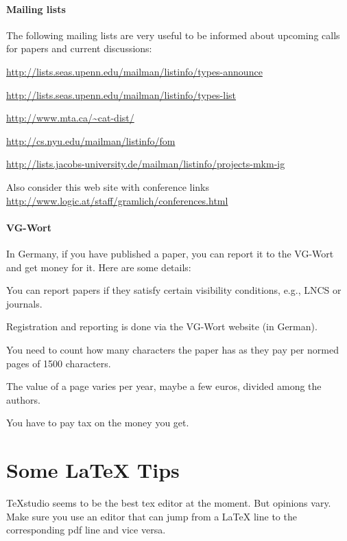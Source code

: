 \documentclass[12pt]{article}
\begin{document}
\paragraph{Mailing lists}
The following mailing lists are very useful to be informed about upcoming calls for papers and current discussions:
\begin{compactitem}
\item \url{http://lists.seas.upenn.edu/mailman/listinfo/types-announce}
\item \url{http://lists.seas.upenn.edu/mailman/listinfo/types-list}
\item \url{http://www.mta.ca/~cat-dist/}
\item \url{http://cs.nyu.edu/mailman/listinfo/fom}
\item \url{http://lists.jacobs-university.de/mailman/listinfo/projects-mkm-ig}
\end{compactitem}

Also consider this web site with conference links
\url{http://www.logic.at/staff/gramlich/conferences.html}

\paragraph{VG-Wort}
In Germany, if you have published a paper, you can report it to the VG-Wort and get money for it. Here are some details:
\begin{compactitem}
\item You can report papers if they satisfy certain visibility conditions, e.g., LNCS or journals.
\item Registration and reporting is done via the VG-Wort website (in German).
\item You need to count how many characters the paper has as they pay per normed pages of 1500 characters.
\item The value of a page varies per year, maybe a few euros, divided among the authors.
\item You have to pay tax on the money you get.
\end{compactitem}

\section{Some LaTeX Tips}

TeXstudio seems to be the best tex editor at the moment.
But opinions vary.
Make sure you use an editor that can jump from a LaTeX line to the corresponding pdf line and vice versa.
\medskip
\end{document}
